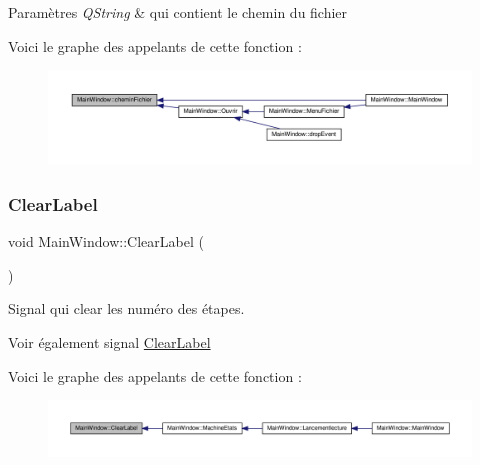 \begin{DoxyParams}{Paramètres}
{\em Q\+String} & qui contient le chemin du fichier \\
\hline
\end{DoxyParams}
Voici le graphe des appelants de cette fonction \+:
\nopagebreak
\begin{figure}[H]
\begin{center}
\leavevmode
\includegraphics[width=350pt]{class_main_window_a397116dafcb548fec351091cc025b822_icgraph}
\end{center}
\end{figure}
\mbox{\label{class_main_window_a9a0c33e6e696ffc763560205f992650d}} 
\subsubsection{\texorpdfstring{Clear\+Label}{ClearLabel}}
{\footnotesize\ttfamily void Main\+Window\+::\+Clear\+Label (\begin{DoxyParamCaption}{ }\end{DoxyParamCaption})\hspace{0.3cm}{\ttfamily [signal]}}



Signal qui clear les numéro des étapes. 

\begin{DoxySeeAlso}{Voir également}
signal \hyperlink{class_main_window_a9a0c33e6e696ffc763560205f992650d}{Clear\+Label} 
\end{DoxySeeAlso}
Voici le graphe des appelants de cette fonction \+:
\nopagebreak
\begin{figure}[H]
\begin{center}
\leavevmode
\includegraphics[width=350pt]{class_main_window_a9a0c33e6e696ffc763560205f992650d_icgraph}
\end{center}
\end{figure}
\mbox{\label{class_main_window_ada907d7d00283f37f6876e28f5a7874e}} 
